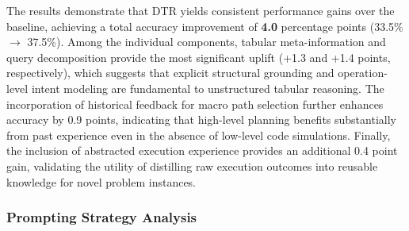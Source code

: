 The results demonstrate that DTR yields consistent performance gains over the baseline, achieving a total accuracy improvement of \textbf{4.0} percentage points (33.5\% $\rightarrow$ 37.5\%). Among the individual components, tabular meta-information and query decomposition provide the most significant uplift (+1.3 and +1.4 points, respectively), which suggests that explicit structural grounding and operation-level intent modeling are fundamental to unstructured tabular reasoning. The incorporation of historical feedback for macro path selection further enhances accuracy by 0.9 points, indicating that high-level planning benefits substantially from past experience even in the absence of low-level code simulations. Finally, the inclusion of abstracted execution experience provides an additional 0.4 point gain, validating the utility of distilling raw execution outcomes into reusable knowledge for novel problem instances.


\begin{table}[ht!]
\centering
\caption{Exploration over prompting strategy for think and code.}
\label{tab:prompt_ablation}
\end{table}
\subsubsection{Prompting Strategy Analysis}
\label{sec:prompt-ablation}

